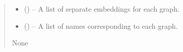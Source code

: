 \documentclass[letterpaper,10pt,english]{sphinxhowto}
\begin{document}
\begin{fulllineitems}
\begin{fulllineitems}
\begin{quote}
\begin{description}
\begin{itemize}
\item {} 
\sphinxAtStartPar
{} () – A list of separate embeddings for each graph.

\item {} 
\sphinxAtStartPar
{} () – A list of names corresponding to each graph.

\end{itemize}

\sphinxAtStartPar
None

\end{description}\end{quote}

\end{fulllineitems}


\end{fulllineitems}

\end{document}
